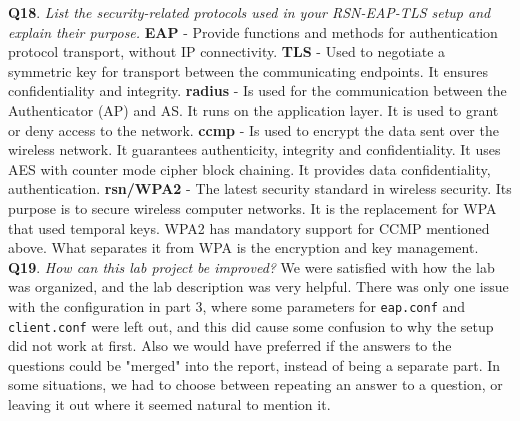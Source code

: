 \documentclass[a4paper,11pt]{article}
\begin{document}
\noindent\textbf{Q18}.\textit{ List the security-related protocols used in your RSN-EAP-TLS setup and explain their purpose.} \textbf{EAP} - Provide functions and methods for authentication protocol transport, without IP connectivity. \textbf{TLS} - Used to negotiate a symmetric key for transport between the communicating endpoints. It ensures confidentiality and integrity. \textbf{\gls{radius}} - Is used for the communication between the Authenticator (AP) and AS. It runs on the application layer. It is used to grant or deny access to the network. \textbf{\gls{ccmp}} - Is used to encrypt the data sent over the wireless network. It guarantees authenticity, integrity and confidentiality. It uses AES with counter mode cipher block chaining. It provides data confidentiality, authentication. \textbf{\gls{rsn}/WPA2} - The latest security standard in wireless security. Its purpose is to secure wireless computer networks. It is the replacement for WPA that used temporal keys. WPA2 has mandatory support for CCMP mentioned above. What separates it from WPA is the encryption and key management.\\

\noindent\textbf{Q19}. \textit{How can this lab project be improved?} We were satisfied with how the lab was organized, and the lab description was very helpful. There was only one issue with the configuration in part 3, where some parameters for \texttt{eap.conf} and \texttt{client.conf} were left out, and this did cause some confusion to why the setup did not work at first. Also we would have preferred if the answers to the questions could be "merged" into the report, instead of being a separate part. In some situations, we had to choose between repeating an answer to a question, or leaving it out where it seemed natural to mention it.
\end{document}
